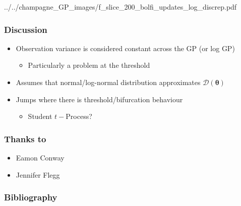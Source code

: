 \documentclass{beamer}
\begin{document}
\begin{frame}
{{            ../../champagne_GP_images/f_slice_200_bolfi_updates_log_discrep.pdf}}
\end{frame}

\begin{frame}
    \frametitle{Discussion}
    \begin{itemize}
        \item Observation variance is considered constant across the GP (or log GP)\begin{itemize}
                  \item Particularly a problem at the threshold
              \end{itemize}
        \item Assumes that normal/log-normal distribution approximates $\mathcal{D}(\bm{\theta})$
        \item Jumps where there is threshold/bifurcation behaviour\begin{itemize}
                  \item Student $t-$Process?
              \end{itemize}
    \end{itemize}
\end{frame}

\begin{frame}
    \frametitle{Thanks to}
    \begin{itemize}
        \item Eamon Conway
        \item Jennifer Flegg
    \end{itemize}
\end{frame}

\begin{frame}
    \frametitle{Bibliography}
    \printbibliography
\end{frame}
\end{document}
